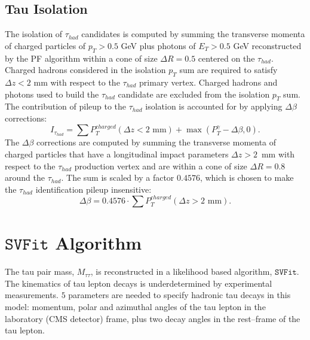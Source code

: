 \subsection{Tau Isolation}
The isolation of $\tau_{had}$ candidates is computed
by summing the transverse momenta of charged particles 
of $p_{T} > 0.5$ GeV plus photons of $E_{T} > 0.5$ GeV 
reconstructed by the PF algorithm
within a cone of size $\Delta R = 0.5$ centered on the $\tau_{had}$.
Charged hadrons considered in the isolation $p_{T}$ sum 
are required to satisfy $\Delta z < 2$ mm with respect to the 
$\tau_{had}$ primary vertex.
Charged hadrons and photons used to build the $\tau_{had}$ candidate 
are excluded from the isolation $p_{T}$ sum.
The contribution of pileup to the $\tau_{had}$ isolation 
is accounted for by applying $\Delta \beta$ corrections:
\begin{equation*}
I_{\tau_{had}} = \sum P_{T}^{charged} (\Delta z < 2\mbox{~mm}) + \max \left( P_{T}^{\gamma} - \Delta \beta, 0 \right).
\end{equation*}
The $\Delta \beta$ corrections are computed by summing the transverse
momenta of charged particles that have a longitudinal impact 
parameters $\Delta z > 2$~mm with respect to the 
$\tau_{had}$ production vertex
and are within a cone of size $\Delta R = 0.8$ around the $\tau_{had}$.
The sum is scaled by a factor $0.4576$, which is chosen to 
make the $\tau_{had}$ identification pileup insensitive:
\begin{equation*}
\Delta \beta = 0.4576 \cdot \sum P_{T}^{charged} (\Delta z > 2\mbox{~mm}).
\end{equation*}

\section{$\mathtt{SVFit}$ Algorithm}
\label{sec:SVFIT}
The tau pair mass, $M_{\tau\tau}$, is reconstructed in a likelihood based algorithm, $\mathtt{SVFit}$\cite{CMS-PAPER-HIG-10-002}.
The kinematics of tau lepton decays is underdetermined by experimental measurements.
$5$ parameters are needed to specify hadronic tau decays in this model:
momentum, polar and azimuthal angles of the tau lepton in the laboratory (CMS detector) frame,
plus two decay angles in the rest--frame of the tau lepton.

